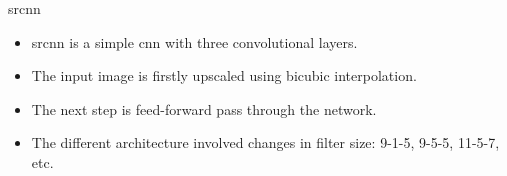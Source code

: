 \documentclass[hyperref={unicode}, xcolor=dvipsnames, t]{beamer}
\begin{document}
\begin{frame}{\texorpdfstring{\gls{srcnn}}{Lg}}
    \begin{itemize}
        \item<1> \gls{srcnn} is a simple \gls{cnn} with \alert{three} convolutional layers.
        \item<1> The input image is firstly upscaled using bicubic interpolation.
        \item<1> The next step is feed-forward pass through the network.
        \item<1> The different architecture involved changes in filter size: 9-1-5, 9-5-5, 11-5-7, etc.
    \end{itemize}
    
    \begin{center}
\end{center}
\end{frame}
\end{document}

